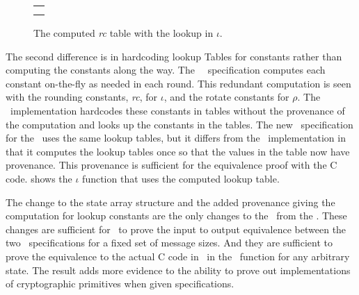 \begin{figure}[t]
  \begin{center}
    \begin{tabular}{l}
      \usebox{\cryciota} \\ \\
    \end{tabular}
  \end{center}
  \caption{The computed \emph{rc} table with the lookup in $\iota$.}
  \label{fig:iota}
\end{figure}

The second difference is in hardcoding lookup Tables for constants rather than computing the constants along the way.
The \fips\ \cryptol\ specification computes each constant on-the-fly as needed in each round.
This redundant computation is seen with the rounding constants, \emph{rc}, for $\iota$, and the rotate constants for $\rho$. 
The \openssl\ implementation hardcodes these constants in tables without the provenance of the computation and looks up the constants in the tables.
The new \cryptol\ specification for the \openssl\ uses the same lookup tables, but it differs from the \openssl\ implementation in that it computes the lookup tables once so that the values in the table now have provenance.
This provenance is sufficient for the equivalence proof with the C code.
 shows the $\iota$ function that uses the computed lookup table.

The change to the state array structure and the added provenance giving the computation for lookup constants are the only changes to the \cryptol\ from the \fips.
These changes are sufficient for \saw\ to prove the input to output equivalence between the two \cryptol\ specifications for a fixed set of message sizes.
And they are sufficient to prove the equivalence to the actual C code in \openssl\ in the \keccak\ function for any arbitrary state.
The result adds more evidence to the ability to prove out implementations of cryptographic primitives when given specifications. 